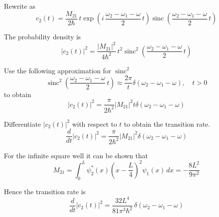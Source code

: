 \documentclass[12pt]{article}
\begin{document}
Rewrite as
\begin{equation*}
c_2(t)=\frac{M_{21}}{2\hbar}\,t
\exp\left(i\,\frac{\omega_2-\omega_1-\omega}{2}\,t\right)
\operatorname{sinc}\left(\frac{\omega_2-\omega_1-\omega}{2}\,t\right)
\tag{2}
\end{equation*}

The probability density is
\begin{equation*}
|c_2(t)|^2=\frac{|M_{21}|^2}{4\hbar^2}\,t^2
\operatorname{sinc}^2\left(\frac{\omega_2-\omega_1-\omega}{2}\,t\right)
\end{equation*}

Use the following approximation for $\operatorname{sinc}^2$
\begin{equation*}
\operatorname{sinc}^2\left(\frac{\omega_2-\omega_1-\omega}{2}\,t\right)
\approx\frac{2\pi}{t}\delta(\omega_2-\omega_1-\omega),
\quad
t>0
\end{equation*}
to obtain
\begin{equation*}
|c_2(t)|^2=\frac{\pi}{2\hbar^2}|M_{21}|^2t\delta(\omega_2-\omega_1-\omega)
\tag{3}
\end{equation*}

Differentiate $|c_2(t)|^2$ with respect to $t$ to obtain the transition rate.
\begin{equation*}
\frac{d}{dt}|c_2(t)|^2=\frac{\pi}{2\hbar^2}|M_{21}|^2\delta(\omega_2-\omega_1-\omega)
\end{equation*}

For the infinite square well it can be shown that
\begin{equation*}
M_{21}=\int_0^L\psi_2^*(x)\left(x-\frac{L}{4}\right)^2\psi_1(x)\,dx
=-\frac{8L^2}{9\pi^2}
\tag{4}
\end{equation*}

Hence the transition rate is
\begin{equation*}
\frac{d}{dt}|c_2(t)|^2=\frac{32L^4}{81\pi^3\hbar^2}
\,\delta(\omega_2-\omega_1-\omega)
\end{equation*}
\end{document}
